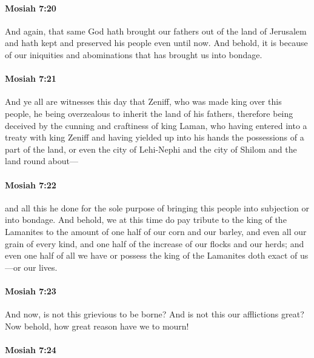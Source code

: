 		\paragraph{Mosiah 7:20} %
			\label{MOSIAH-7-20}

			And again, that same God hath brought our fathers out of the land of Jerusalem
			and hath kept and preserved his people even until now.
			And behold, it is because of our iniquities and abominations
			that has brought us into bondage.

		\paragraph{Mosiah 7:21} %
			\label{MOSIAH-7-21}

			And ye all are witnesses this day
			that Zeniff, who was made king over this people,
			he being overzealous to inherit the land of his fathers,
			therefore being deceived by the cunning and craftiness of king Laman,
			who having entered into a treaty with king Zeniff
			and having yielded up into his hands the possessions of a part of the land,
			or even the city of Lehi-Nephi and the city of Shilom and the land round about---

		\paragraph{Mosiah 7:22} %
			\label{MOSIAH-7-22}

			and all this he done for the sole purpose
			of bringing this people into subjection or into bondage.
			And behold, we at this time do pay tribute to the king of the Lamanites
			to the amount of one half of our corn and our barley,
			and even all our grain of every kind,
			and one half of the increase of our flocks and our herds;
			and even one half of all we have or possess
			the king of the Lamanites doth exact of us---or our lives.

		\paragraph{Mosiah 7:23} %
			\label{MOSIAH-7-23}

			And now, is not this grievious to be borne?
			And is not this our afflictions great?
			Now behold, how great reason have we to mourn!

		\paragraph{Mosiah 7:24} %
			\label{MOSIAH-7-24}

